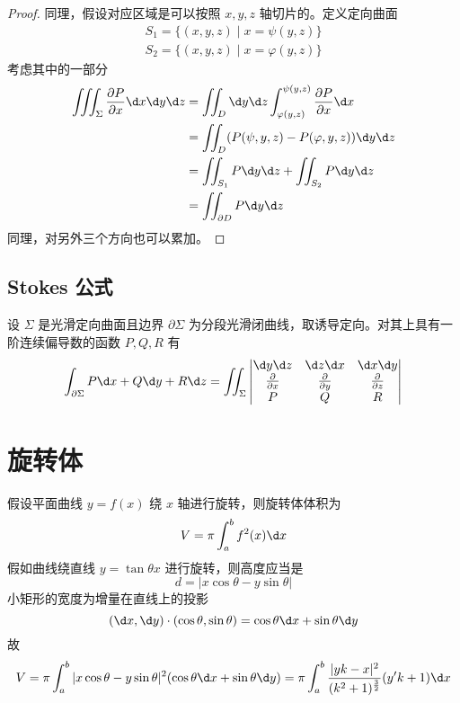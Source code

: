\begin{proof}
	同理，假设对应区域是可以按照 $x, y, z$ 轴切片的。定义定向曲面
	\[ \begin{aligned}
			S_1 = \{ (x, y, z) \mid x = \psi(y, z) \} \\
			S_2 = \{ (x, y, z) \mid x = \varphi(y, z) \}
		\end{aligned} \]
	考虑其中的一部分
	\[ \begin{aligned}
			\iiint_\Sigma \frac{\partial P}{\partial x} \d x \d y \d z
			 & = \iint_D \d y \d z \int_{\varphi(y, z)}^{\psi(y, z)} \frac{\partial P}{\partial x} \d x \\
			 & = \iint_D (P(\psi, y, z) - P(\varphi, y, z)) \d y \d z                                   \\
			 & = \iint_{S_1} P \d y \d z + \iint_{S_2} P \d y \d z                                      \\
			 & = \iint_{\partial D} P \d y \d z
		\end{aligned} \]
	同理，对另外三个方向也可以累加。
\end{proof}

\subsection{Stokes 公式}

\begin{theorem}[Stokes 公式]
	设 $\Sigma$ 是光滑定向曲面且边界 $\partial \Sigma$ 为分段光滑闭曲线，取诱导定向。对其上具有一阶连续偏导数的函数 $P, Q, R$ 有
	\[ \int_{\partial \Sigma} P \d x + Q \d y + R \d z = \iint_\Sigma \left| \begin{matrix}
			\d y \d z                   & \d z \d x                   & \d x \d y                   \\
			\frac{\partial}{\partial x} & \frac{\partial}{\partial y} & \frac{\partial}{\partial z} \\
			P                           & Q                           & R
		\end{matrix} \right| \]
\end{theorem}

\section{旋转体}

假设平面曲线 $y = f(x)$ 绕 $x$ 轴进行旋转，则旋转体体积为
\[ V = \pi \int_a^b f^2(x) \d x \]
假如曲线绕直线 $y = \tan \theta x$ 进行旋转，则高度应当是
\[ d = |x \cos \theta - y \sin \theta| \]
小矩形的宽度为增量在直线上的投影
\[ (\d x, \d y) \cdot (\cos \theta, \sin \theta) = \cos \theta \d x + \sin \theta \d y \]
故
\[ V = \pi \int_a^b |x \cos \theta - y \sin \theta|^2(\cos \theta \d x + \sin \theta \d y) = \pi \int_a^b \frac{|yk-x|^2}{(k^2+1)^{\frac{3}{2}}}(y'k+1) \d x \]


